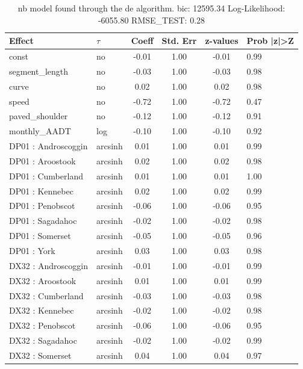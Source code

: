 \begin{table}
	\caption{nb model found through the de algorithm. bic: 12595.34 Log-Likelihood: -6055.80 RMSE_TEST: 0.28}
	\begin{center}
		\begin{tabular}{|l|l|c|c|c|l|}
			\hline
			Effect & $\tau$ & Coeff & Std. Err & z-values & Prob |z|>Z \\
			\hline
			const & no & -0.01 & 1.00 & -0.01 & 0.99 \\
			\hline
			segment_length & no & -0.03 & 1.00 & -0.03 & 0.98 \\
			\hline
			curve & no & 0.02 & 1.00 & 0.02 & 0.98 \\
			\hline
			speed & no & -0.72 & 1.00 & -0.72 & 0.47 \\
			\hline
			paved_shoulder & no & -0.12 & 1.00 & -0.12 & 0.91 \\
			\hline
			monthly_AADT & log & -0.10 & 1.00 & -0.10 & 0.92 \\
			\hline
			DP01 : Androscoggin & arcsinh & 0.01 & 1.00 & 0.01 & 0.99 \\
			\hline
			DP01 : Aroostook & arcsinh & 0.02 & 1.00 & 0.02 & 0.98 \\
			\hline
			DP01 : Cumberland & arcsinh & 0.01 & 1.00 & 0.01 & 1.00 \\
			\hline
			DP01 : Kennebec & arcsinh & 0.02 & 1.00 & 0.02 & 0.99 \\
			\hline
			DP01 : Penobscot & arcsinh & -0.06 & 1.00 & -0.06 & 0.95 \\
			\hline
			DP01 : Sagadahoc & arcsinh & -0.02 & 1.00 & -0.02 & 0.98 \\
			\hline
			DP01 : Somerset & arcsinh & -0.05 & 1.00 & -0.05 & 0.96 \\
			\hline
			DP01 : York & arcsinh & 0.03 & 1.00 & 0.03 & 0.98 \\
			\hline
			DX32 : Androscoggin & arcsinh & -0.01 & 1.00 & -0.01 & 0.99 \\
			\hline
			DX32 : Aroostook & arcsinh & 0.01 & 1.00 & 0.01 & 0.99 \\
			\hline
			DX32 : Cumberland & arcsinh & -0.03 & 1.00 & -0.03 & 0.98 \\
			\hline
			DX32 : Kennebec & arcsinh & -0.02 & 1.00 & -0.02 & 0.98 \\
			\hline
			DX32 : Penobscot & arcsinh & -0.06 & 1.00 & -0.06 & 0.95 \\
			\hline
			DX32 : Sagadahoc & arcsinh & -0.02 & 1.00 & -0.02 & 0.99 \\
			\hline
			DX32 : Somerset & arcsinh & 0.04 & 1.00 & 0.04 & 0.97 \\

\end{tabular}
\end{center}
\end{table}
